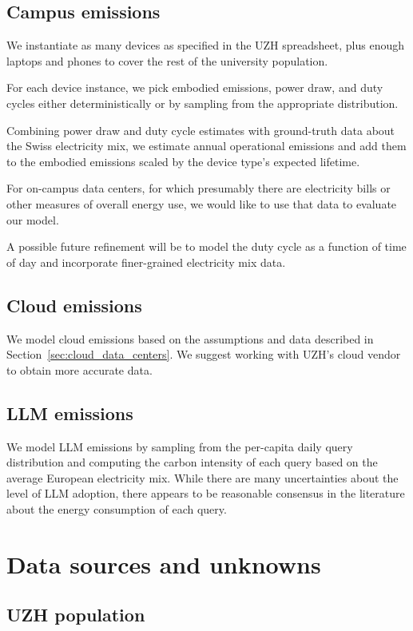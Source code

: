 \documentclass[11pt]{article}
\begin{document}
\subsection{Campus emissions}

We instantiate as many devices as specified in the UZH spreadsheet, plus enough laptops and phones
to cover the rest of the university population.

For each device instance, we pick embodied emissions, power draw, and duty cycles either
deterministically or by sampling from the appropriate distribution.

Combining power draw and duty cycle estimates with ground-truth data about the Swiss electricity mix,
we estimate annual operational emissions and add them to the embodied emissions scaled by the device
type's expected lifetime.

For on-campus data centers, for which presumably there are electricity bills or other measures of
overall energy use, we would like to use that data to evaluate our model.

A possible future refinement will be to model the duty cycle as a function of time of day
and incorporate finer-grained electricity mix data.

\subsection{Cloud emissions}

We model cloud emissions based on the assumptions and data described in
Section~\ref{sec:cloud_data_centers}. We suggest working with UZH's cloud vendor to obtain
more accurate data.

\subsection{LLM emissions}

We model LLM emissions by sampling from the per-capita daily query distribution and computing
the carbon intensity of each query based on the average European electricity mix. While there 
are many uncertainties about the level of LLM adoption, there appears to be reasonable consensus
in the literature about the energy consumption of each query.

\section{Data sources and unknowns}

\subsection{UZH population}
\end{document}
